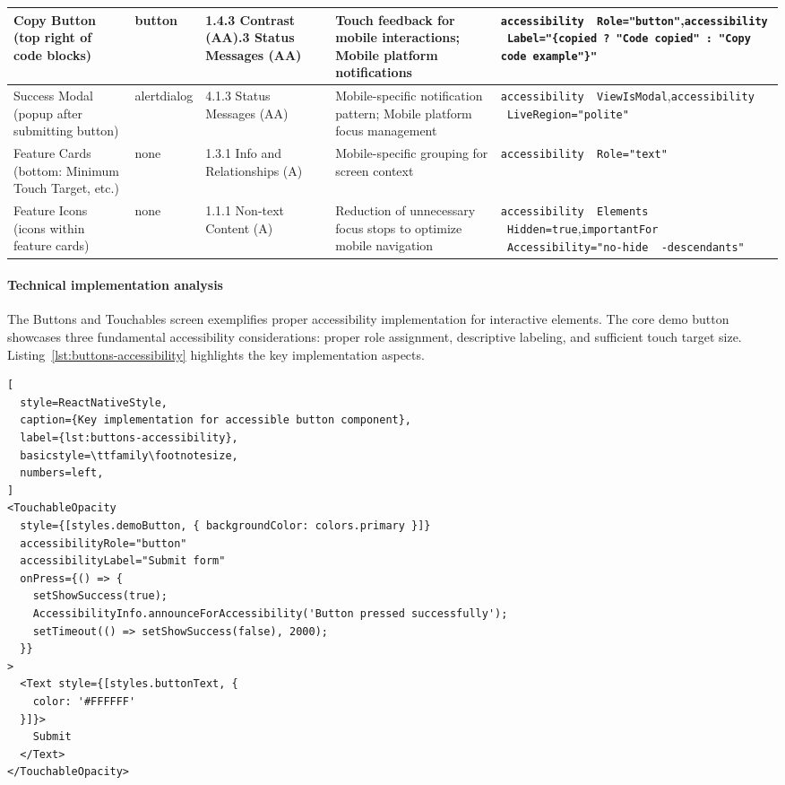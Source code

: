 \begin{longtable}[c]{|C{2.5cm}|C{2cm}|C{2.8cm}|C{2.8cm}|C{4.7cm}|}
\hline
Copy Button (top right of code blocks) & button & 1.4.3 Contrast (AA).3 Status Messages (AA) & Touch feedback for mobile interactions; Mobile platform notifications & \texttt{accessibility \ Role="button"},\newline \texttt{accessibility \ Label="\{copied ? "Code copied" : "Copy code example"\}"} \\
\hline
Success Modal (popup after submitting button) & alertdialog & 4.1.3 Status Messages (AA) & Mobile-specific notification pattern; Mobile platform focus management & \texttt{accessibility \ ViewIsModal},\newline \texttt{accessibility \ LiveRegion="polite"} \\
\hline
Feature Cards (bottom: Minimum Touch Target, etc.) & none & 1.3.1 Info and Relationships (A) & Mobile-specific grouping for screen context & \texttt{accessibility \ Role="text"} \\
\hline
Feature Icons (icons within feature cards) & none & 1.1.1 Non-text Content (A) & Reduction of unnecessary focus stops to optimize mobile navigation & \texttt{accessibility \ Elements \ Hidden=true},\newline \texttt{importantFor \ Accessibility="no-hide \ -descendants"} \\
\end{longtable}
\FloatBarrier

\paragraph{Technical implementation analysis}

The Buttons and Touchables screen exemplifies proper accessibility implementation for interactive elements. The core demo button showcases three fundamental accessibility considerations: proper role assignment, descriptive labeling, and sufficient touch target size. Listing~\ref{lst:buttons-accessibility} highlights the key implementation aspects.

\begin{lstlisting}[
  style=ReactNativeStyle,
  caption={Key implementation for accessible button component},
  label={lst:buttons-accessibility},
  basicstyle=\ttfamily\footnotesize,
  numbers=left,
]
<TouchableOpacity
  style={[styles.demoButton, { backgroundColor: colors.primary }]}
  accessibilityRole="button"
  accessibilityLabel="Submit form"
  onPress={() => {
    setShowSuccess(true);
    AccessibilityInfo.announceForAccessibility('Button pressed successfully');
    setTimeout(() => setShowSuccess(false), 2000);
  }}
>
  <Text style={[styles.buttonText, {
    color: '#FFFFFF'
  }]}>
    Submit
  </Text>
</TouchableOpacity>
\end{lstlisting}
\FloatBarrier

